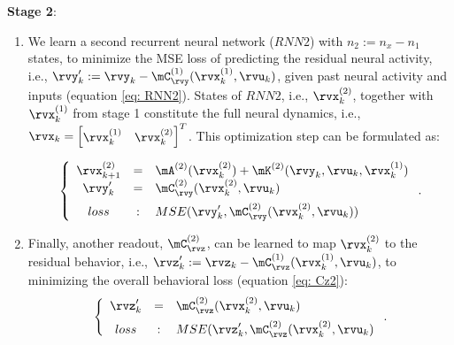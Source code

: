 \documentclass{article} %
\newcommand{\RNN}[1]{\(\textit{RNN#1}\)} %
\begin{document}
\textbf{Stage 2}\label{stage2}: 
\begin{enumerate}[leftmargin=*]
\item[\textbf{2a}]
    We learn a second recurrent neural network (\RNN2) with $n_2 := n_x - n_1$ states, to minimize the MSE loss of predicting the residual neural activity, i.e., \(\rvy^\prime_{k} := \rvy_{k} - \mC_{\rvy}^{(1)}(\rvx_{k}^{(1)}, \rvu_{k})\), given past neural activity and inputs (equation \ref{eq: RNN2}). States of \RNN2, i.e., \(\rvx_{k}^{(2)}\), together with \(\rvx_{k}^{(1)}\) from stage 1 constitute the full neural dynamics, i.e., $\rvx_{k} = \begin{bmatrix} \rvx_{k}^{(1)} & \rvx_{k}^{(2)}\end{bmatrix}^T$. This optimization step can be formulated as: 

    \begin{equation}\label{eq: RNN2}
        \left\{
        \begin{array}{ccl}
        \rvx_{k+1}^{(2)} &=& \mA^{(2)}(\rvx_{k}^{(2)}) + \mK^{(2)}(\rvy_{k}, \rvu_{k}, \rvx_{k}^{(1)})\\  
        \rvy^\prime_{k} &=& \mC_{\rvy}^{(2)}(\rvx_{k}^{(2)}, \rvu_{k})\\[5pt]
        loss&:& MSE(\rvy^\prime_{k}, \mC_{\rvy}^{(2)}(\rvx_{k}^{(2)}, \rvu_{k}))
        \end{array}
        \right.
        .
    \end{equation}

    \item[\textbf{2b}]
    Finally, another readout, \(\mC_{\rvz}^{(2)}\), can be learned to map \(\rvx_{k}^{(2)}\) to the residual behavior, i.e., \(\rvz^\prime_{k} := \rvz_{k} - \mC_{\rvz}^{(1)}(\rvx_{k}^{(1)}, \rvu_{k})\), to minimizing the overall behavioral loss (equation \ref{eq: Cz2}):
    \begin{equation}\label{eq: Cz2}
        \left\{
        \begin{array}{ccl}
        \rvz^\prime_{k} &=& \mC_{\rvz}^{(2)}(\rvx_{k}^{(2)}, \rvu_{k})\\[5pt]
        loss&:& MSE(\rvz^\prime_{k}, \mC_{\rvz}^{(2)}(\rvx_{k}^{(2)}, \rvu_{k})
        \end{array}
        \right.
        .
    \end{equation}
    
\end{enumerate}
\end{document}
